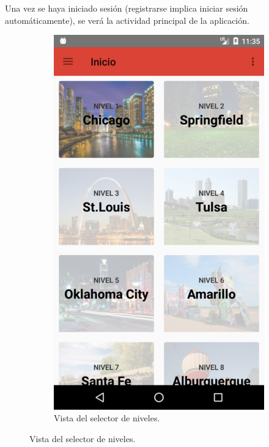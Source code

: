 \documentclass[twoside]{report}
\begin{document}
Una vez se haya iniciado sesión (registrarse implica iniciar sesión automáticamente), se verá la actividad principal de la aplicación.

\begin{figure}[H]
\begin{center}
	\begin{subfigure}[t]{.3\linewidth}
		\includegraphics[scale=0.2]{images/userguide/1.png}
		\caption{Vista del selector de niveles.}
	\end{subfigure}\hspace{3mm}%

\end{center}
\end{figure}
\end{document}

